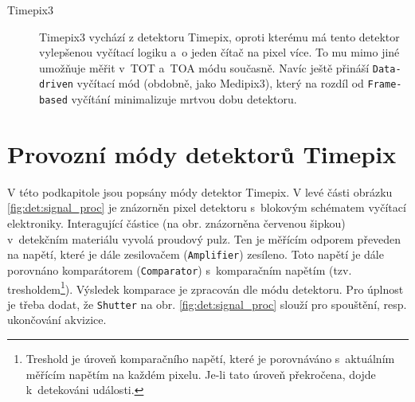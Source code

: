 \begin{description}
	

	\item[Timepix3] Timepix3 vychází z detektoru Timepix, oproti kterému má tento detektor vylepšenou vyčítací logiku a~o jeden čítač na pixel více. To mu mimo jiné umožňuje měřit v~TOT a~TOA módu současně. Navíc ještě přináší \texttt{Data-driven} vyčítací mód (obdobně, jako Medipix3), který na rozdíl od \texttt{Frame-based} vyčítání minimalizuje mrtvou dobu detektoru.

\end{description}

\section{Provozní módy detektorů Timepix}\label{det:mod}
V této podkapitole jsou popsány módy detektor Timepix. 
V levé části obrázku \ref{fig:det:signal_proc} je znázorněn pixel detektoru s~blokovým schématem vyčítací elektroniky. Interagující částice (na obr. znázorněna červenou šipkou) v~detekčním materiálu vyvolá proudový pulz. Ten je měřícím odporem převeden na napětí, které je dále zesilovačem (\texttt{Amplifier}) zesíleno. Toto napětí je dále porovnáno komparátorem (\texttt{Comparator}) s~komparačním napětím (tzv. tresholdem\footnote{Treshold je úroveň komparačního napětí, které je porovnáváno s~aktuálním měřícím napětím na každém pixelu. Je-li tato úroveň překročena, dojde k~detekováni události.}). 
Výsledek komparace je zpracován dle módu detektoru. Pro úplnost je třeba dodat, že \texttt{Shutter} na obr. \ref{fig:det:signal_proc} slouží pro spouštění, resp. ukončování akvizice.

